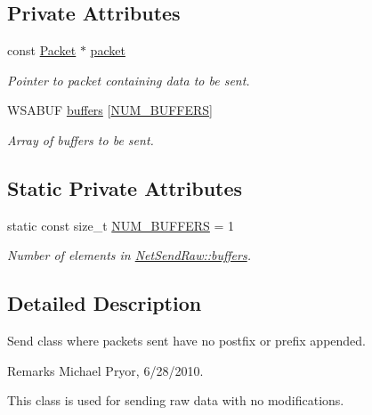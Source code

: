 \subsection*{Private Attributes}
\begin{DoxyCompactItemize}
\item 
\hypertarget{class_net_send_raw_a2b05ae1fabb6e5acd6f5f04d47658258}{
const \hyperlink{class_packet}{Packet} $\ast$ \hyperlink{class_net_send_raw_a2b05ae1fabb6e5acd6f5f04d47658258}{packet}}
\label{class_net_send_raw_a2b05ae1fabb6e5acd6f5f04d47658258}

\begin{DoxyCompactList}\small\item\em Pointer to packet containing data to be sent. \item\end{DoxyCompactList}\item 
WSABUF \hyperlink{class_net_send_raw_a65c08b77ebbf2d2e6825d72a55fd5a67}{buffers} \mbox{[}\hyperlink{class_net_send_raw_a8cedc005f8989485477c911523451f4f}{NUM\_\-BUFFERS}\mbox{]}
\begin{DoxyCompactList}\small\item\em Array of buffers to be sent. \item\end{DoxyCompactList}\end{DoxyCompactItemize}
\subsection*{Static Private Attributes}
\begin{DoxyCompactItemize}
\item 
\hypertarget{class_net_send_raw_a8cedc005f8989485477c911523451f4f}{
static const size\_\-t \hyperlink{class_net_send_raw_a8cedc005f8989485477c911523451f4f}{NUM\_\-BUFFERS} = 1}
\label{class_net_send_raw_a8cedc005f8989485477c911523451f4f}

\begin{DoxyCompactList}\small\item\em Number of elements in \hyperlink{class_net_send_raw_a65c08b77ebbf2d2e6825d72a55fd5a67}{NetSendRaw::buffers}. \item\end{DoxyCompactList}\end{DoxyCompactItemize}


\subsection{Detailed Description}
Send class where packets sent have no postfix or prefix appended. \begin{DoxyRemark}{Remarks}
Michael Pryor, 6/28/2010.
\end{DoxyRemark}
This class is used for sending raw data with no modifications. 

